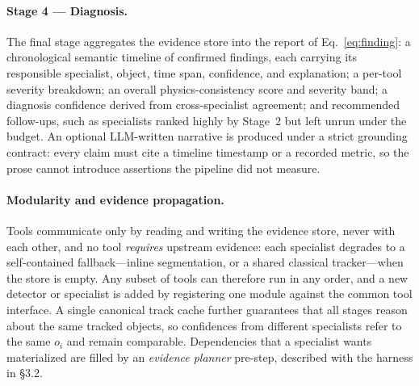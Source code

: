 \paragraph{Stage 4 --- Diagnosis.} The final stage aggregates the evidence store into the report of Eq.~\ref{eq:finding}: a chronological semantic timeline of confirmed findings, each carrying its responsible specialist, object, time span, confidence, and explanation; a per-tool severity breakdown; an overall physics-consistency score and severity band; a diagnosis confidence derived from cross-specialist agreement; and recommended follow-ups, such as specialists ranked highly by Stage~2 but left unrun under the budget. An optional LLM-written narrative is produced under a strict grounding contract: every claim must cite a timeline timestamp or a recorded metric, so the prose cannot introduce assertions the pipeline did not measure.
 
\paragraph{Modularity and evidence propagation.} Tools communicate only by reading and writing the evidence store, never with each other, and no tool \emph{requires} upstream evidence: each specialist degrades to a self-contained fallback---inline segmentation, or a shared classical tracker---when the store is empty. Any subset of tools can therefore run in any order, and a new detector or specialist is added by registering one module against the common tool interface. A single canonical track cache further guarantees that all stages reason about the same tracked objects, so confidences from different specialists refer to the same $o_i$ and remain comparable. Dependencies that a specialist wants materialized are filled by an \emph{evidence planner} pre-step, described with the harness in \S3.2.